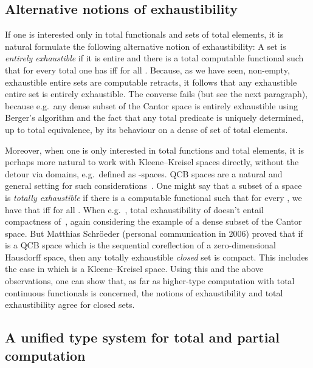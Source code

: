 \documentclass{LMCS}
\begin{document}
\subsection{Alternative notions of exhaustibility}

If one is interested only in total functionals and sets of total
elements, it is natural formulate the following alternative notion of
exhaustibility: A set  is \emph{entirely exhaustible}
if it is entire and there is a total computable functional  such that for every total  one has  iff  for all . Because, as we have seen, non-empty, exhaustible entire sets
are computable retracts, it follows that any exhaustible entire set is
entirely exhaustible. The converse fails (but see the next paragraph),
because e.g.\ any dense subset of the Cantor space is entirely
exhaustible using Berger's algorithm and the fact that any total
predicate is uniquely determined, up to total equivalence, by its
behaviour on a dense of set of total elements.

Moreover, when one is only interested in total functions and total
elements, it is perhaps more natural to work with Kleene--Kreisel
spaces directly, without the detour via domains, e.g.\ defined as
-spaces.  QCB spaces are a natural and general setting for such
considerations~\cite{MR2328287,MR1948051}.  One might say that a
subset  of a space~ is \emph{totally exhaustible} if there is a
computable functional  such
that for every , we have that
 iff  for all .  When e.g.\
, total exhaustibility of  doesn't entail
compactness of~, again considering the example of a dense subset of
the Cantor space. But Matthias Schr\"oeder (personal communication in
2006) proved that if  is a QCB space which is the sequential
coreflection of a zero-dimensional Hausdorff space, then any totally
exhaustible \emph{closed} set  is compact. This includes
the case in which  is a Kleene--Kreisel space. Using this and the
above observations, one can show that, as far as higher-type
computation with total continuous functionals is concerned, the
notions of exhaustibility and total exhaustibility agree for closed
sets.

\subsection{A unified type system for total and partial computation}
\end{document}
